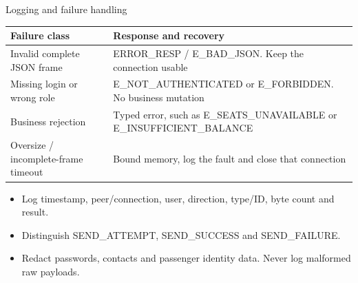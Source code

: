 \documentclass[t,aspectratio=169]{beamer}
\newenvironment{points}{\begin{itemize}\setlength{\itemsep}{6pt}}{\end{itemize}}
\begin{document}
\begin{frame}{Logging and failure handling}
\small
\begin{tabularx}{\textwidth}{@{}lY@{}}
\toprule
\textbf{Failure class} & \textbf{Response and recovery}\\
\midrule
Invalid complete JSON frame & ERROR\_RESP / E\_BAD\_JSON. Keep the connection usable\\
Missing login or wrong role & E\_NOT\_AUTHENTICATED or E\_FORBIDDEN. No business mutation\\
Business rejection & Typed error, such as E\_SEATS\_UNAVAILABLE or E\_INSUFFICIENT\_BALANCE\\
Oversize / incomplete-frame timeout & Bound memory, log the fault and close that connection\\
\bottomrule
\end{tabularx}
\begin{points}
\item Log timestamp, peer/connection, user, direction, type/ID, byte count and result.
\item Distinguish SEND\_ATTEMPT, SEND\_SUCCESS and SEND\_FAILURE.
\item Redact passwords, contacts and passenger identity data. Never log malformed raw payloads.
\end{points}
\end{frame}
\end{document}
